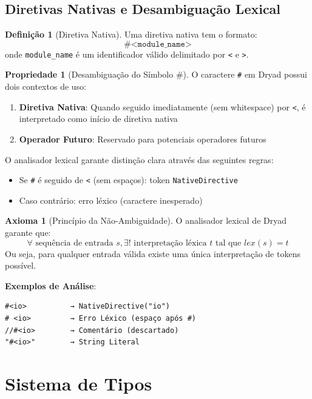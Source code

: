 \documentclass[12pt,a4paper]{article}
\theoremstyle{definition}
\newtheorem{definition}{Definição}[section]
\newtheorem{axiom}{Axioma}[section]
\newtheorem{property}{Propriedade}[section]
\begin{document}
\subsection{Diretivas Nativas e Desambiguação Lexical}

\begin{definition}[Diretiva Nativa]
Uma diretiva nativa tem o formato:
\[
\texttt{\#<module\_name>}
\]
onde \texttt{module\_name} é um identificador válido delimitado por \texttt{<} e \texttt{>}.
\end{definition}

\begin{property}[Desambiguação do Símbolo \#]
O caractere \texttt{\#} em Dryad possui dois contextos de uso:
\begin{enumerate}
    \item \textbf{Diretiva Nativa}: Quando seguido imediatamente (sem whitespace) por \texttt{<}, é interpretado como início de diretiva nativa
    \item \textbf{Operador Futuro}: Reservado para potenciais operadores futuros
\end{enumerate}

O analisador lexical garante distinção clara através das seguintes regras:
\begin{itemize}
    \item Se \texttt{\#} é seguido de \texttt{<} (sem espaços): token \texttt{NativeDirective}
    \item Caso contrário: erro léxico (caractere inesperado)
\end{itemize}
\end{property}

\begin{axiom}[Princípio da Não-Ambiguidade]
O analisador lexical de Dryad garante que:
\[
\forall \text{ sequência de entrada } s, \exists! \text{ interpretação léxica } t \text{ tal que } lex(s) = t
\]
Ou seja, para qualquer entrada válida existe uma única interpretação de tokens possível.
\end{axiom}

\textbf{Exemplos de Análise}:
\begin{verbatim}
#<io>          → NativeDirective("io")
# <io>         → Erro Léxico (espaço após #)
//#<io>        → Comentário (descartado)
"#<io>"        → String Literal
\end{verbatim}

\section{Sistema de Tipos}
\end{document}
